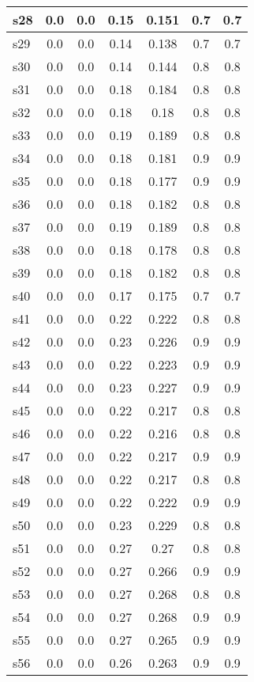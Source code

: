 \documentclass{article}
\begin{document}
\begin{tabular}{|l|c|c|c|c|c|c|}
\hline
s28 &0.0 & 0.0 & 0.15 & 0.151 & 0.7 & 0.7\\
\hline
s29 &0.0 & 0.0 & 0.14 & 0.138 & 0.7 & 0.7\\
\hline
s30 &0.0 & 0.0 & 0.14 & 0.144 & 0.8 & 0.8\\
\hline
s31 &0.0 & 0.0 & 0.18 & 0.184 & 0.8 & 0.8\\
\hline
s32 &0.0 & 0.0 & 0.18 & 0.18 & 0.8 & 0.8\\
\hline
s33 &0.0 & 0.0 & 0.19 & 0.189 & 0.8 & 0.8\\
\hline
s34 &0.0 & 0.0 & 0.18 & 0.181 & 0.9 & 0.9\\
\hline
s35 &0.0 & 0.0 & 0.18 & 0.177 & 0.9 & 0.9\\
\hline
s36 &0.0 & 0.0 & 0.18 & 0.182 & 0.8 & 0.8\\
\hline
s37 &0.0 & 0.0 & 0.19 & 0.189 & 0.8 & 0.8\\
\hline
s38 &0.0 & 0.0 & 0.18 & 0.178 & 0.8 & 0.8\\
\hline
s39 &0.0 & 0.0 & 0.18 & 0.182 & 0.8 & 0.8\\
\hline
s40 &0.0 & 0.0 & 0.17 & 0.175 & 0.7 & 0.7\\
\hline
s41 &0.0 & 0.0 & 0.22 & 0.222 & 0.8 & 0.8\\
\hline
s42 &0.0 & 0.0 & 0.23 & 0.226 & 0.9 & 0.9\\
\hline
s43 &0.0 & 0.0 & 0.22 & 0.223 & 0.9 & 0.9\\
\hline
s44 &0.0 & 0.0 & 0.23 & 0.227 & 0.9 & 0.9\\
\hline
s45 &0.0 & 0.0 & 0.22 & 0.217 & 0.8 & 0.8\\
\hline
s46 &0.0 & 0.0 & 0.22 & 0.216 & 0.8 & 0.8\\
\hline
s47 &0.0 & 0.0 & 0.22 & 0.217 & 0.9 & 0.9\\
\hline
s48 &0.0 & 0.0 & 0.22 & 0.217 & 0.8 & 0.8\\
\hline
s49 &0.0 & 0.0 & 0.22 & 0.222 & 0.9 & 0.9\\
\hline
s50 &0.0 & 0.0 & 0.23 & 0.229 & 0.8 & 0.8\\
\hline
s51 &0.0 & 0.0 & 0.27 & 0.27 & 0.8 & 0.8\\
\hline
s52 &0.0 & 0.0 & 0.27 & 0.266 & 0.9 & 0.9\\
\hline
s53 &0.0 & 0.0 & 0.27 & 0.268 & 0.8 & 0.8\\
\hline
s54 &0.0 & 0.0 & 0.27 & 0.268 & 0.9 & 0.9\\
\hline
s55 &0.0 & 0.0 & 0.27 & 0.265 & 0.9 & 0.9\\
\hline
s56 &0.0 & 0.0 & 0.26 & 0.263 & 0.9 & 0.9\\

\end{tabular}
\end{document}
